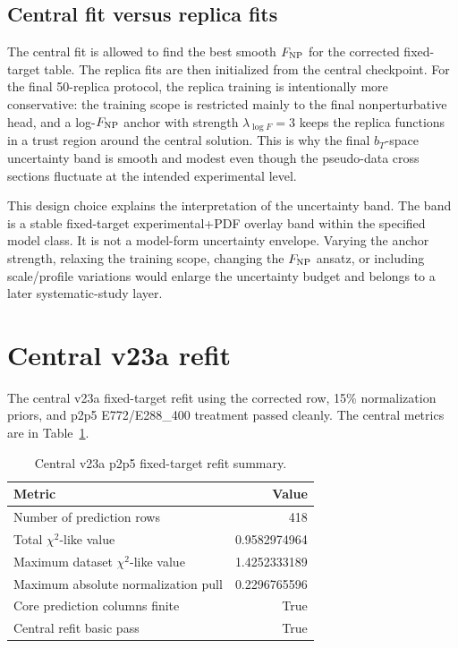 \documentclass[11pt]{article}
\newcommand{\bt}{b_T}
\newcommand{\FNP}{F_{\rm NP}}
\newcommand{\chisq}{\chi^2}
\begin{document}
\subsection{Central fit versus replica fits}

The central fit is allowed to find the best smooth $\FNP$ for the corrected fixed-target table.  The replica fits are then initialized from the central checkpoint.  For the final 50-replica protocol, the replica training is intentionally more conservative: the training scope is restricted mainly to the final nonperturbative head, and a log-$\FNP$ anchor with strength $\lambda_{\log F}=3$ keeps the replica functions in a trust region around the central solution.  This is why the final $\bt$-space uncertainty band is smooth and modest even though the pseudo-data cross sections fluctuate at the intended experimental level.

This design choice explains the interpretation of the uncertainty band.  The band is a stable fixed-target experimental+PDF overlay band within the specified model class.  It is not a model-form uncertainty envelope.  Varying the anchor strength, relaxing the training scope, changing the $\FNP$ ansatz, or including scale/profile variations would enlarge the uncertainty budget and belongs to a later systematic-study layer.

\section{Central v23a refit}

The central v23a fixed-target refit using the corrected row, 15\% normalization priors, and p2p5 E772/E288\_400 treatment passed cleanly.  The central metrics are in Table~\ref{tab:central}.

\begin{table}[H]
\centering
\caption{Central v23a p2p5 fixed-target refit summary.}
\label{tab:central}
\begin{tabular}{lr}
\toprule
Metric & Value \\
\midrule
Number of prediction rows & 418 \\
Total $\chisq$-like value & 0.9582974964 \\
Maximum dataset $\chisq$-like value & 1.4252333189 \\
Maximum absolute normalization pull & 0.2296765596 \\
Core prediction columns finite & True \\
Central refit basic pass & True \\
\bottomrule
\end{tabular}
\end{table}
\end{document}
